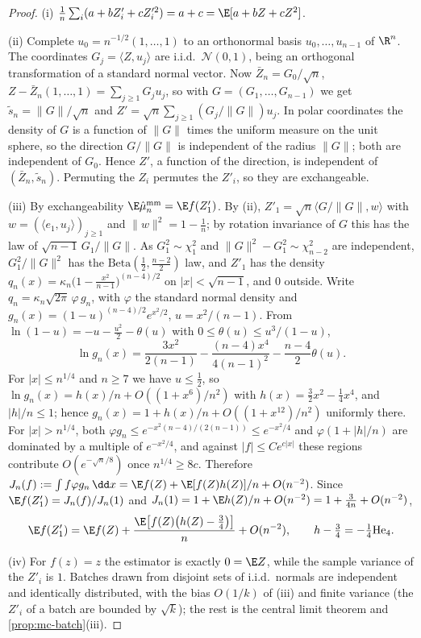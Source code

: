 \begin{proof}
(i) $\frac1n\sum_i(a+bZ'_i+cZ'^2_i)=a+c=\E[a+bZ+cZ^2]$.

(ii) Complete $u_0=n^{-1/2}(1,\dots,1)$ to an orthonormal basis $u_0,\dots,u_{n-1}$ of
$\R^n$. The coordinates $G_j=\langle Z,u_j\rangle$ are i.i.d.\ $\mathcal N(0,1)$, being an
orthogonal transformation of a standard normal vector. Now $\bar Z_n=G_0/\sqrt n$,
$Z-\bar Z_n(1,\dots,1)=\sum_{j\ge1}G_ju_j$, so with $G=(G_1,\dots,G_{n-1})$ we get
$\tilde s_n=\|G\|/\sqrt n$ and $Z'=\sqrt n\sum_{j\ge1}(G_j/\|G\|)u_j$. In polar coordinates the
density of $G$ is a function of $\|G\|$ times the uniform measure on the unit sphere, so
the direction $G/\|G\|$ is independent of the radius $\|G\|$; both are independent of
$G_0$. Hence $Z'$, a function of the direction, is independent of $(\bar Z_n,\tilde s_n)$.
Permuting the $Z_i$ permutes the $Z'_i$, so they are exchangeable.

(iii) By exchangeability $\E\hat\mu^{\mathrm{mm}}_n=\E f(Z'_1)$. By (ii),
$Z'_1=\sqrt n\langle G/\|G\|,w\rangle$ with $w=(\langle e_1,u_j\rangle)_{j\ge1}$ and
$\|w\|^2=1-\frac1n$; by rotation invariance of $G$ this has the law of
$\sqrt{n-1}\,G_1/\|G\|$. As $G_1^2\sim\chi^2_1$ and $\|G\|^2-G_1^2\sim\chi^2_{n-2}$ are
independent, $G_1^2/\|G\|^2$ has the $\mathrm{Beta}(\frac12,\frac{n-2}2)$ law, and $Z'_1$ has the
density $q_n(x)=\kappa_n\big(1-\frac{x^2}{n-1}\big)^{(n-4)/2}$ on $|x|<\sqrt{n-1}$, and $0$
outside. Write $q_n=\kappa_n\sqrt{2\pi}\,\varphi\,g_n$, with $\varphi$ the standard normal
density and $g_n(x)=(1-u)^{(n-4)/2}e^{x^2/2}$, $u=x^2/(n-1)$. From
$\ln(1-u)=-u-\frac{u^2}2-\theta(u)$ with $0\le\theta(u)\le u^3/(1-u)$,
\[
  \ln g_n(x)=\frac{3x^2}{2(n-1)}-\frac{(n-4)x^4}{4(n-1)^2}-\frac{n-4}{2}\theta(u) .
\]
For $|x|\le n^{1/4}$ and $n\ge7$ we have $u\le\frac12$, so $\ln g_n(x)=h(x)/n+O((1+x^6)/n^2)$
with $h(x)=\frac32x^2-\frac14x^4$, and $|h|/n\le1$; hence
$g_n(x)=1+h(x)/n+O((1+x^{12})/n^2)$ uniformly there. For $|x|>n^{1/4}$, both $\varphi g_n\le
e^{-x^2(n-4)/(2(n-1))}\le e^{-x^2/4}$ and $\varphi(1+|h|/n)$ are dominated by a multiple of
$e^{-x^2/4}$, and against $|f|\le Ce^{c|x|}$ these regions contribute $O(e^{-\sqrt n/8})$ once
$n^{1/4}\ge8c$. Therefore $J_n(f):=\int f\varphi g_n\,\dd x=\E f(Z)+\E[f(Z)h(Z)]/n+O(n^{-2})$.
Since $\E f(Z'_1)=J_n(f)/J_n(1)$ and $J_n(1)=1+\E h(Z)/n+O(n^{-2})=1+\frac{3}{4n}+O(n^{-2})$,
\[
  \E f(Z'_1)=\E f(Z)+\frac{\E\big[f(Z)\big(h(Z)-\frac34\big)\big]}{n}+O(n^{-2}),
  \qquad h-\tfrac34=-\tfrac14\mathrm{He}_4 .
\]

(iv) For $f(z)=z$ the estimator is exactly $0=\E Z$, while the sample variance of the
$Z'_i$ is $1$. Batches drawn from disjoint sets of i.i.d.\ normals are independent and
identically distributed, with the bias $O(1/k)$ of (iii) and finite variance (the $Z'_i$ of a
batch are bounded by $\sqrt k$); the rest is the central limit theorem and
\cref{prop:mc-batch}(iii).
\end{proof}

